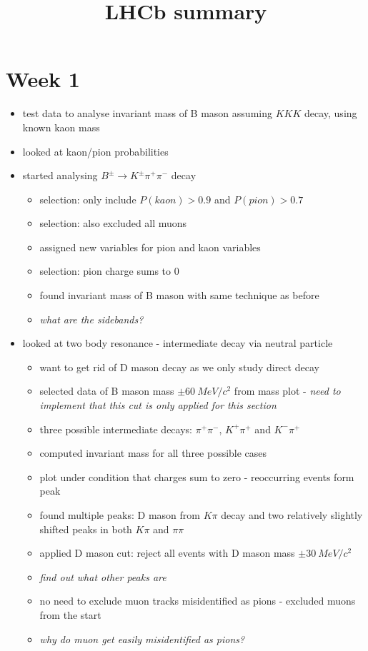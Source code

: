 \documentclass[10pt]{article}
\begin{document}
\title{LHCb summary}
\date{}
\maketitle
\section{Week 1}
\begin{itemize}
\item test data to analyse invariant mass of B mason assuming $KKK$ decay, using known kaon mass
\item looked at kaon/pion probabilities
\item started analysing $B^{\pm} \rightarrow K^{\pm}\pi^+\pi^-$ decay
\begin{itemize}
\item selection: only include $P(kaon) > 0.9$ and $P(pion) > 0.7$
\item selection: also excluded all muons
\item assigned new variables for pion and kaon variables
\item selection: pion charge sums to 0
\item found invariant mass of B mason with same technique as before
\item \textit{what are the sidebands?}
\end{itemize}
\item looked at two body resonance - intermediate decay via neutral particle
\begin{itemize}
\item want to get rid of  D mason decay as we only study direct decay
\item selected data of B mason mass $\pm 60~MeV/c^2$ from mass plot - \textit{need to implement that this cut is only applied for this section}
\item three possible intermediate decays: $\pi^+\pi^-$, $K^+\pi^+$ and $K^-\pi^+$
\item computed invariant mass for all three possible cases
\item plot under condition that charges sum to zero - reoccurring events form peak
\item found multiple peaks: D mason from $K\pi$ decay and two relatively slightly shifted peaks in both $K\pi$ and $\pi \pi$
\item applied D mason cut: reject all events with D mason mass $\pm 30 ~MeV/c^2$
\item \textit{find out what other peaks are}
\item no need to exclude muon tracks misidentified as pions - excluded muons from the start
\item \textit{why do muon get easily misidentified as pions?}
\end{itemize}
\end{itemize}
\end{document}

